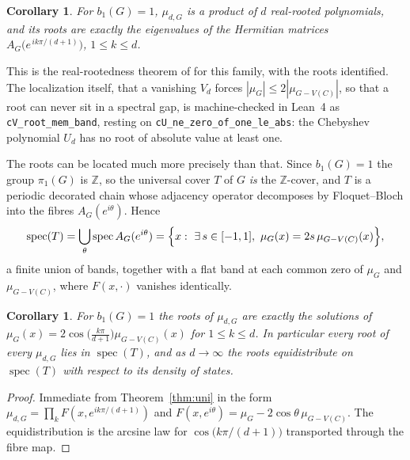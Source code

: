 \documentclass[11pt]{article}
\newtheorem{corollary}[theorem]{Corollary}
\theoremstyle{remark}
\begin{document}
\begin{corollary}\label{cor:unirr}
For $b_1(G)=1$, $\mu_{d,G}$ is a product of $d$ real-rooted polynomials, and its
roots are exactly the eigenvalues of the Hermitian matrices
$A_G\bigl(e^{\,ik\pi/(d+1)}\bigr)$, $1\le k\le d$.
\end{corollary}

This is the real-rootedness theorem of \cite{HPS} for this family, with the
roots identified. The localization itself, that a vanishing $V_d$ forces
$|\mu_G|\le2|\mu_{G-V(C)}|$, so that a root can never sit in a spectral gap, is machine-checked in Lean~4 as \texttt{cV\_root\_mem\_band}, resting on
\texttt{cU\_ne\_zero\_of\_one\_le\_abs}: the Chebyshev polynomial $U_d$ has no
root of absolute value at least one.

The roots can be located much more precisely than that. Since $b_1(G)=1$ the
group $\pi_1(G)$ is $\mathbb{Z}$, so the universal cover $T$ of $G$ \emph{is}
the $\mathbb{Z}$-cover, and $T$ is a periodic decorated chain whose adjacency
operator decomposes by Floquet--Bloch into the fibres $A_G(e^{i\theta})$. Hence
\[
\operatorname{spec}(T)=\bigcup_{\theta}\operatorname{spec}A_G(e^{i\theta})
=\Bigl\{x:\ \exists\,s\in[-1,1],\ \mu_G(x)=2s\,\mu_{G-V(C)}(x)\Bigr\},
\]
a finite union of bands, together with a flat band at each common zero of
$\mu_G$ and $\mu_{G-V(C)}$, where $F(x,\cdot)$ vanishes identically.

\begin{corollary}\label{cor:floquet}
For $b_1(G)=1$ the roots of $\mu_{d,G}$ are exactly the solutions of
$\mu_G(x)=2\cos\!\bigl(\tfrac{k\pi}{d+1}\bigr)\mu_{G-V(C)}(x)$ for
$1\le k\le d$. In particular every root of every $\mu_{d,G}$ lies in
$\operatorname{spec}(T)$, and as $d\to\infty$ the roots equidistribute on
$\operatorname{spec}(T)$ with respect to its density of states.
\end{corollary}

\begin{proof}
Immediate from Theorem~\ref{thm:uni} in the form
$\mu_{d,G}=\prod_{k}F(x,e^{ik\pi/(d+1)})$ and
$F(x,e^{i\theta})=\mu_G-2\cos\theta\,\mu_{G-V(C)}$. The equidistribution is the
arcsine law for $\cos\bigl(k\pi/(d+1)\bigr)$ transported through the fibre map.
\end{proof}
\end{document}
